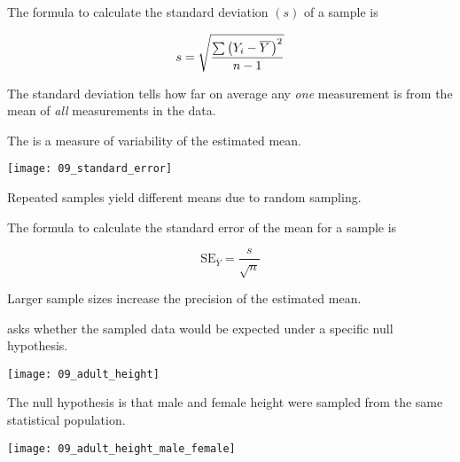 \documentclass[t]{beamer}
\newcommand*\meanY{\overline{Y\kern1.67pt}\kern-1.67pt}
\newcommand*\meansubY{\overline{Y}}
\begin{document}
%
\begin{frame}[t]{The formula to calculate the standard deviation $(s)$ of a sample is}

{\Large
\[ s = \sqrt{\frac{\sum\left(Y_i - \meanY\kern1.67pt\right)^2}{n-1}} \]
}

\hangpara The standard deviation tells how far on average any
\emph{one} measurement is from the mean of \emph{all} measurements in 
the data. 

\end{frame}
%
\begin{frame}[t]{The  is a measure of variability of the estimated mean.}

	\vspace*{-\baselineskip}
	
	{\centering 
	\texttt{[image: 09\_standard\_error]} \par
	}
	
	\hangpara Repeated samples yield different means due to random sampling. 
	
\end{frame}
%
\begin{frame}[t]{The formula to calculate the standard error of the mean for a sample is}

{\Large
\[ \mathrm{SE}_{\meansubY} = \frac{s}{\sqrt{n}} \]
}

\hangpara Larger sample sizes increase the precision of the estimated mean.

\end{frame}
%
%
\begin{frame}[t]{ asks whether the sampled data would be expected under a specific null hypothesis.}

	\vspace{-0.5\baselineskip}
	
	{\centering
	\texttt{[image: 09\_adult\_height]}\par
	}

\end{frame}
%
\begin{frame}[t]{The null hypothesis is that male and female height were sampled from the same statistical population.}

	\vspace{-0.5\baselineskip}

	{\centering
	\texttt{[image: 09\_adult\_height\_male\_female]}\par
	}

\end{frame}
\end{document}
